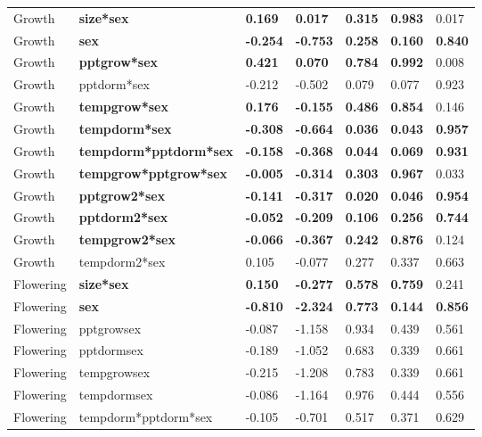 \documentclass[9pt,twoside,lineno]{pnas-new}
\begin{document}
\begin{table}[]
\begin{tabular}{lllllll}
Growth & \textbf{size*sex} & \textbf{0.169} & \textbf{0.017} & \textbf{0.315} & \textbf{0.983} & 0.017 \\
Growth & \textbf{sex} & \textbf{-0.254} & \textbf{-0.753} & \textbf{0.258} & \textbf{0.160} & \textbf{0.840} \\
Growth & \textbf{pptgrow*sex} & \textbf{0.421} & \textbf{0.070} & \textbf{0.784} & \textbf{0.992} & 0.008 \\
Growth & pptdorm*sex & -0.212 & -0.502 & 0.079 & 0.077 & 0.923 \\
Growth & \textbf{tempgrow*sex} & \textbf{0.176} & \textbf{-0.155} & \textbf{0.486} & \textbf{0.854} & 0.146 \\
Growth & \textbf{tempdorm*sex} & \textbf{-0.308} & \textbf{-0.664} & \textbf{0.036} & \textbf{0.043} & \textbf{0.957} \\
Growth & \textbf{tempdorm*pptdorm*sex} & \textbf{-0.158} & \textbf{-0.368} & \textbf{0.044} & \textbf{0.069} & \textbf{0.931} \\
Growth & \textbf{tempgrow*pptgrow*sex} & \textbf{-0.005} & \textbf{-0.314} & \textbf{0.303} & \textbf{0.967} & 0.033 \\
Growth & \textbf{pptgrow2*sex} & \textbf{-0.141} & \textbf{-0.317} & \textbf{0.020} & \textbf{0.046} & \textbf{0.954} \\
Growth & \textbf{pptdorm2*sex} & \textbf{-0.052} & \textbf{-0.209} & \textbf{0.106} & \textbf{0.256} & \textbf{0.744} \\
Growth & \textbf{tempgrow2*sex} & \textbf{-0.066} & \textbf{-0.367} & \textbf{0.242} & \textbf{0.876} & 0.124 \\
Growth & tempdorm2*sex & 0.105 & -0.077 & 0.277 & 0.337 & 0.663 \\
Flowering & \textbf{size*sex} & \textbf{0.150} & \textbf{-0.277} & \textbf{0.578} & \textbf{0.759} & 0.241 \\
Flowering & \textbf{sex} & \textbf{-0.810} & \textbf{-2.324} & \textbf{0.773} & \textbf{0.144} & \textbf{0.856} \\
Flowering & pptgrowsex & -0.087 & -1.158 & 0.934 & 0.439 & 0.561 \\
Flowering & pptdormsex & -0.189 & -1.052 & 0.683 & 0.339 & 0.661 \\
Flowering & tempgrowsex & -0.215 & -1.208 & 0.783 & 0.339 & 0.661 \\
Flowering & tempdormsex & -0.086 & -1.164 & 0.976 & 0.444 & 0.556 \\
Flowering & tempdorm*pptdorm*sex & -0.105 & -0.701 & 0.517 & 0.371 & 0.629 \\

\end{tabular}
\end{table}
\end{document}
